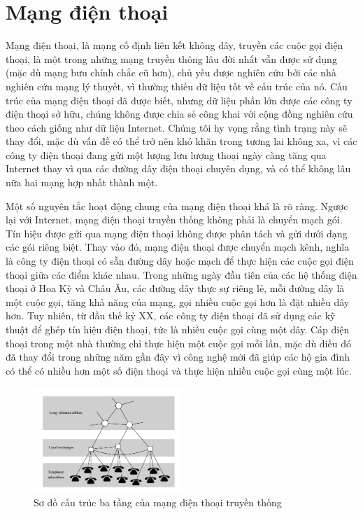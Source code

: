 \section{Mạng điện thoại}
Mạng điện thoại, là mạng cố định liên kết không dây, truyền các cuộc gọi điện thoại, là một trong những mạng truyền thông lâu đời nhất vẫn được sử dụng (mặc dù mạng bưu chính chắc cũ hơn), chủ yếu được nghiên cứu bởi các nhà nghiên cứu mạng lý thuyết, vì thường thiếu dữ liệu tốt về cấu trúc của nó. Cấu trúc của mạng điện thoại đã được biết, nhưng dữ liệu phần lớn được các công ty điện thoại sở hữu, chúng không được chia sẻ công khai với cộng đồng nghiên cứu theo cách giống như dữ liệu Internet. Chúng tôi hy vọng rằng tình trạng này sẽ thay đổi, mặc dù vấn đề có thể trở nên khó khăn trong tương lai không xa, vì các công ty điện thoại đang gửi một lượng lưu lượng thoại ngày càng tăng qua Internet thay vì qua các đường dây điện thoại chuyên dụng, và có thể không lâu nữa hai mạng hợp nhất thành một.\par
Một số nguyên tắc hoạt động chung của mạng điện thoại khá là rõ ràng. Ngược lại với Internet, mạng điện thoại truyền thống không phải là chuyển mạch gói. Tín hiệu được gửi qua mạng điện thoại không được phân tách và gửi dưới dạng các gói riêng biệt. Thay vào đó, mạng điện thoại được chuyển mạch kênh, nghĩa là công ty điện thoại có sẵn đường dây hoặc mạch để thực hiện các cuộc gọi điện thoại giữa các điểm khác nhau. Trong những ngày đầu tiên của các hệ thống điện thoại ở Hoa Kỳ và Châu Âu, các đường dây thực sự riêng lẻ, mỗi đường dây là một cuộc gọi, tăng khả năng của mạng, gọi nhiều cuộc gọi hơn là đặt nhiều dây hơn. Tuy nhiên, từ đầu thế kỷ XX, các công ty điện thoại đã sử dụng các kỹ thuật để ghép tín hiệu điện thoại, tức là nhiều cuộc gọi cùng một dây. Cáp điện thoại trong một nhà thường chỉ thực hiện một cuộc gọi mỗi lần, mặc dù điều đó đã thay đổi trong những năm gần đây vì công nghệ mới đã giúp các hộ gia đình có thể có nhiều hơn một số điện thoại và thực hiện nhiều cuộc gọi cùng một lúc.\par
\begin{figure}[ht]
\centering
\includegraphics[width=0.5\textwidth]{res/h24.png}
\caption{Sơ đồ cấu trúc ba tầng của mạng điện thoại truyền thống}
\label{fig:h24}
\end{figure}\par
